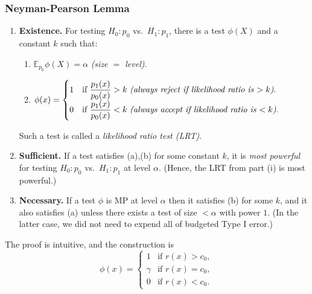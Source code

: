 \subsubsection{Neyman-Pearson Lemma}
\begin{lem}
\hfill
\begin{enumerate}
  \item[(i)] \textbf{Existence.} For testing $H_0 : p_0$ vs.\ $H_1 : p_1$, there is 
  a test $\phi(X)$ and a constant $k$ such that:
  \begin{enumerate}
    \item[(a)] $\mathbb{E}_{p_0}\phi(X) = \alpha$ \emph{(size $=$ level)}.
    \item[(b)] $\phi(x) = \begin{cases}
      1 & \text{if } \dfrac{p_1(x)}{p_0(x)} > k \text{ \emph{(always reject if likelihood ratio is $> k$)}.} \\[2pt]
      0 & \text{if } \dfrac{p_1(x)}{p_0(x)} < k \text{ \emph{(always accept if likelihood ratio is $< k$)}.}
    \end{cases}$
  \end{enumerate}
  Such a test is called a \emph{likelihood ratio test (LRT)}.

  \item[(ii)] \textbf{Sufficient.} If a test satisfies (a),(b) for some constant $k$, 
  it is \emph{most powerful} for testing $H_0 : p_0$ vs.\ $H_1 : p_1$ at level 
  $\alpha$. (Hence, the LRT from part (i) is most powerful.)

  \item[(iii)] \textbf{Necessary.} If a test $\phi$ is MP at level $\alpha$ then it 
  satisfies (b) for some $k$, and it also satisfies (a) unless there exists a test 
  of size $< \alpha$ with power $1$. (In the latter case, we did not need to expend 
  all of budgeted Type I error.)
\end{enumerate}
\end{lem}
\begin{rem}
    The proof is intuitive, and the construction is
    \[
  \phi(x) = \begin{cases}
    1      & \text{if } r(x) > c_0, \\
    \gamma & \text{if } r(x) = c_0, \\
    0      & \text{if } r(x) < c_0.
  \end{cases}
\]
\end{rem}

